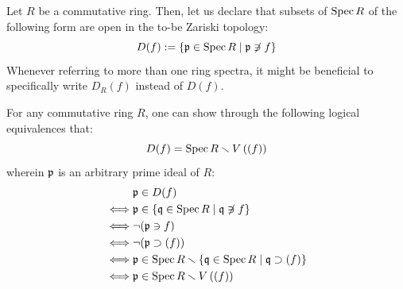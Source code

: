             \begin{definition} \label{def: zariski_open}
                Let $R$ be a commutative ring. Then, let us declare that subsets of $\operatorname{Spec} R$ of the following form are open in the to-be Zariski topology:
                    $$D(f) := \{\mathfrak{p} \in \operatorname{Spec} R \mid \mathfrak{p} \not \ni f\}$$
                Whenever referring to more than one ring spectra, it might be beneficial to specifically write $D_R(f)$ instead of $D(f)$.
            \end{definition}
            \begin{remark} \label{remark: basic_opens_complements}
                For any commutative ring $R$, one can show through the following logical equivalences that:
                    $$D(f) = \operatorname{Spec} R \smallsetminus V\left((f)\right)$$
                wherein $\mathfrak{p}$ is an arbitrary prime ideal of $R$:
                    $$
                        \begin{aligned}
                            & \mathfrak{p} \in D(f)
                            \\
                            \iff & \mathfrak{p} \in \{\mathfrak{q} \in \operatorname{Spec} R \mid \mathfrak{q} \not \ni f\}
                            \\
                            \iff & \neg(\mathfrak{p} \ni f)
                            \\
                            \iff & \neg(\mathfrak{p} \supset (f))
                            \\
                            \iff & \mathfrak{p} \in \operatorname{Spec} R \smallsetminus \{\mathfrak{q} \in \operatorname{Spec} R \mid \mathfrak{q} \supset (f)\}
                            \\
                            \iff & \mathfrak{p} \in \operatorname{Spec} R \smallsetminus V\left((f)\right)
                        \end{aligned}
                    $$
            \end{remark}
            
